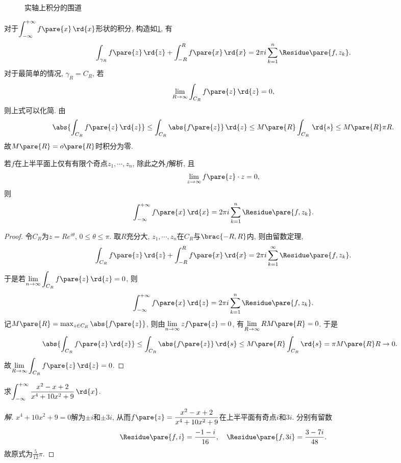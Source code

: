 \documentclass[../ComplexVariable.tex]{subfiles}
\begin{document}
\begin{figure}[ht]
    \centering
    \caption{实轴上积分的围道}
    \label{fig:实轴上积分的围道}
\end{figure}
对于$\displaystyle \int_{-\infty}^{+\infty}f\pare{x}\,\rd{x}$形状的积分, 构造如\cref{fig:实轴上积分的围道}, 有
\[ \int_{\gamma_R} f\pare{z}\,\rd{z} + \int_{-R}^R f\pare{x}\,\rd{x} = 2\pi i \sum_{k=1}^n \Residue\pare{f,z_k}. \]
对于最简单的情况, $\gamma_R = C_R$, 若
\[ \lim_{R\rightarrow\infty} \int_{C_R}f\pare{z}\,\rd{z} = 0, \]
则上式可以化简. 由
\[ \abs{\int_{C_R} f\pare{z}\,\rd{z}} \le \int_{C_R} \abs{f\pare{z}}\,\rd{z} \le M\pare{R}\int_{C_R}\,\rd{s} \le M\pare{R}\pi R. \]
故$M\pare{R} = o\pare{R}$时积分为零.
\begin{theorem}
    若$f$在上半平面上仅有有限个奇点$z_1,\cdots, z_n$, 除此之外$f$解析, 且
    \[ \lim_{z\rightarrow \infty} f\pare{z}\cdot z = 0, \]
    则
    \[ \int_{-\infty}^{+\infty} f\pare{x}\,\rd{x} = 2\pi i \sum_{k=1}^n \Residue\pare{f,z_k}. \]
\end{theorem}
\begin{proof}
    令$C_R$为$z = Re^{i\theta}$, $0\le\theta\le \pi$. 取$R$充分大, $z_1,\cdots, z_n$在$C_R$与$\brac{-R,R}$内, 则由留数定理,
    \[ \int_{C_R} f\pare{z}\,\rd{z} + \int_{-R}^R f\pare{x}\,\rd{x} = 2\pi i \sum_{k=1}^\infty\Residue\pare{f,z_k}. \]
    于是若$\displaystyle \lim_{n\rightarrow\infty}\int_{C_R}f\pare{z}\,\rd{z} = 0$, 则
    \[ \int_{-\infty}^{+\infty} f\pare{x}\,\rd{z} = 2\pi i \sum_{k=1}^n \Residue\pare{f,z_k}. \]
    记$M\pare{R} = \max_{z\in C_R}\abs{f\pare{z}}$, 则由$\displaystyle \lim_{n\rightarrow\infty} zf\pare{z} = 0$, 有$\displaystyle \lim_{R\rightarrow \infty} RM\pare{R} = 0$.
    于是
    \begin{align*}
        \abs{\int_{C_R}f\pare{z}\,\rd{z}} &\le \int_{C_R}\abs{f\pare{z}}\,\rd{s} \le M\pare{R}\int_{C_R}\rd{s} = \pi M\pare{R} R \rightarrow 0.
    \end{align*}
    故$\displaystyle \lim_{R\rightarrow\infty} \int_{C_R} f\pare{z}\,\rd{z} = 0$.
\end{proof}
\begin{sample}
    \begin{ex}
        求$\displaystyle \int_{-\infty}^{+\infty} \frac{x^2-x+2}{x^4+10x^2+9}\,\rd{x}$.
    \end{ex}
    \begin{proof}[解]
        $x^4 + 10x^2 + 9 = 0$解为$\pm i$和$\pm 3 i$, 从而$f\pare{z} = \displaystyle \frac{x^2-x+2}{x^4+10x^2+9}$在上半平面有奇点$i$和$3i$. 分别有留数
        \[ \Residue\pare{f,i} = \frac{-1-i}{16},\quad \Residue\pare{f,3i} = \frac{3-7i}{48}. \]
        故原式为$\displaystyle \frac{5}{12}\pi$.
    \end{proof}
\end{sample}
\end{document}
